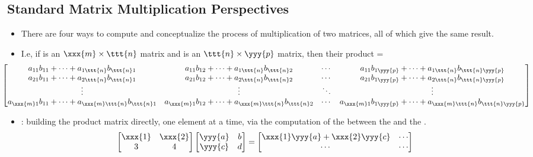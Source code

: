 \begin{itemize}
  \subsection{Standard Matrix Multiplication Perspectives}\label{Standard Matrix Multiplication Perspectives}
  \begin{itemize}
    \item There are four ways to compute and conceptualize the process of multiplication of two matrices, all of which give the same result.
    \item I.e, if  is an \(\xxx{m} \times \ttt{n}\) matrix and  is an \(\ttt{n} \times \yyy{p}\) matrix, then their product  =
    \[%
    \hspace{-25pt}
    {\begin{bmatrix}
      a_{11}b_{11} + \cdots + a_{1\ttt{n}}b_{\ttt{n}1}&a_{11}b_{12} + \cdots + a_{1\ttt{n}}b_{\ttt{n}2} &\cdots &a_{11}b_{1\yyy{p}} + \cdots + a_{1\ttt{n}}b_{\ttt{n}\yyy{p}}
      \\ a_{21}b_{11} + \cdots + a_{2\ttt{n}}b_{\ttt{n}1}&a_{21}b_{12} + \cdots + a_{2\ttt{n}}b_{\ttt{n}2}&\cdots &a_{21}b_{1\yyy{p}} + \cdots + a_{2\ttt{n}}b_{\ttt{n}\yyy{p}}
      \\ \vdots &\vdots &\ddots &\vdots 
      \\ a_{\xxx{m}1}b_{11} + \cdots + a_{\xxx{m}\ttt{n}}b_{\ttt{n}1}&a_{\xxx{m}1}b_{12} + \cdots + a_{\xxx{m}\ttt{n}}b_{\ttt{n}2}&\cdots &a_{\xxx{m}1}b_{1\yyy{p}} + \cdots + a_{\xxx{m}\ttt{n}}b_{\ttt{n}\yyy{p}}
    \end{bmatrix}}
    \]%
    \item {}: building the product matrix directly, one element at a time, via the computation of the \hyperref[The Dot Product]{} between the  and the .
    \begin{align*}
    \begin{bmatrix} \xxx{1} & \xxx{2} \\ 3 & 4 \end{bmatrix}
    \begin{bmatrix} \yyy{a} & b \\ \yyy{c} & d \end{bmatrix}
    &=
    \begin{bmatrix}
    \xxx{1}\yyy{a} + \xxx{2}\yyy{c} & \cdots \\ \cdots & \cdots \end{bmatrix}

\end{align*}
\end{itemize}
\end{itemize}
